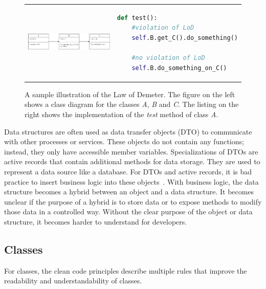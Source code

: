 \begin{figure}
\begin{tabular}{p{}p{}}
    \begin{minipage}{0.45\textwidth}
        \centering
    \includegraphics[width=\linewidth]{img/Background/LawOfDemeterUML.pdf}
    \label{fig:background_control_flow_graph_image}
    \end{minipage}
&
\begin{minipage}[c]{0.45\textwidth}
\centering
\begin{lstlisting}[language=Python, label=lst:background_control_flow_graph_listing]
def test():
    #violation of LoD
    self.B.get_C().do_something()

    #no violation of LoD
    self.B.do_something_on_C()
\end{lstlisting}
\end{minipage}
\end{tabular}
\caption{A sample illustration of the Law of Demeter. The figure on the left shows a class diagram for the classes \textit{A}, \textit{B} and \textit{C}. The listing on the right shows the implementation of the \textit{test} method of class \textit{A}. }
\label{fig:LoD}
\end{figure}



Data structures are often used as data transfer objects (DTO) to communicate with other processes or services. These objects do not contain any functions; instead, they only have accessible member variables. Specializations of DTOs are active records that contain additional methods for data storage. They are used to represent a data source like a database. For DTOs and active records, it is bad practice to insert business logic into these objects~\cite{martin_clean_2009}. With business logic, the data structure becomes a hybrid between an object and a data structure. It becomes unclear if the purpose of a hybrid is to store data or to expose methods to modify those data in a controlled way. Without the clear purpose of the object or data structure, it becomes harder to understand for developers.


\subsection{Classes}\label{sec:classes}
For classes, the clean code principles describe multiple rules that improve the readability and understandability of classes.

